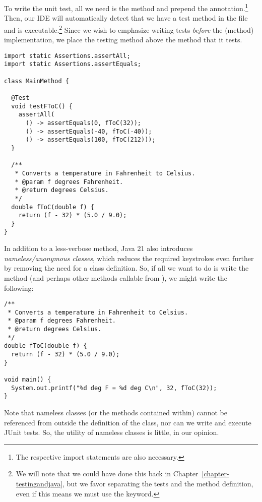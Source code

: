 To write the unit test, all we need is the  method and prepend the  annotation.\footnote{The respective import statements are also necessary.} 
Then, our IDE will automatically detect that we have a test method in the file and is executable.\footnote{We will note that we could have done this back in Chapter~\ref{chapter-testingandjava}, but we favor separating the tests and the method definition, even if this means we must use the  keyword.} 
Since we wish to emphasize writing tests \emph{before} the (method) implementation, we place the testing method above the method that it tests. 

\begin{lstlisting}[language=MyJava]
import static Assertions.assertAll;
import static Assertions.assertEquals;

class MainMethod {

  @Test
  void testFToC() {
    assertAll(
      () -> assertEquals(0, fToC(32));
      () -> assertEquals(-40, fToC(-40));
      () -> assertEquals(100, fToC(212)));
  }
  
  /**
   * Converts a temperature in Fahrenheit to Celsius.
   * @param f degrees Fahrenheit.
   * @return degrees Celsius.
   */
  double fToC(double f) {
    return (f - 32) * (5.0 / 9.0); 
  }
}
\end{lstlisting}

In addition to a less-verbose  method, Java 21 also introduces \emph{nameless/anonymous classes}, which reduces the required keystrokes even further by removing the need for a class definition. 
So, if all we want to do is write the  method (and perhaps other methods callable from ), we might write the following:

\begin{lstlisting}[language=MyJava]
/**
 * Converts a temperature in Fahrenheit to Celsius.
 * @param f degrees Fahrenheit.
 * @return degrees Celsius.
 */
double fToC(double f) {
  return (f - 32) * (5.0 / 9.0); 
}

void main() {
  System.out.printf("%d deg F = %d deg C\n", 32, fToC(32));
}
\end{lstlisting}

Note that nameless classes (or the methods contained within) cannot be referenced from outside the definition of the class, nor can we write and execute JUnit tests. 
So, the utility of nameless classes is little, in our opinion.


